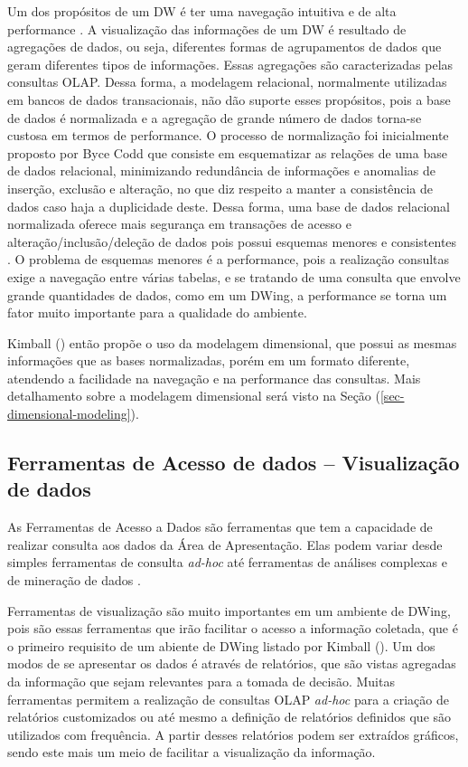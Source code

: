 Um dos propósitos de um DW é ter uma navegação intuitiva e de alta performance \cite{kimball2002}. A visualização das informações de um DW é resultado de agregações de dados, ou seja, diferentes formas de agrupamentos de dados que geram diferentes tipos de informações. Essas agregações são caracterizadas pelas consultas OLAP. Dessa forma, a modelagem relacional, normalmente utilizadas em bancos de dados transacionais, não dão suporte esses propósitos, pois a base de dados é normalizada e a agregação de grande número de dados torna-se custosa em termos de performance. O processo de normalização foi inicialmente proposto por Byce Codd  que consiste em esquematizar as relações de uma base de dados relacional, minimizando redundância de informações e anomalias de inserção, exclusão e alteração, no que diz respeito a manter a consistência de dados caso haja a duplicidade deste. Dessa forma, uma base de dados relacional normalizada oferece mais segurança em transações de acesso e alteração/inclusão/deleção de dados pois possui esquemas menores e consistentes \cite{elmasri2006}. O problema de esquemas menores é a performance, pois a realização consultas exige a navegação  entre várias tabelas, e se tratando de uma consulta que envolve grande quantidades de dados, como em um DWing, a performance se torna um fator muito importante para a qualidade do ambiente.

%

Kimball (\citeyear{kimball2002}) então propõe o uso da modelagem dimensional, que possui as mesmas informações que as bases normalizadas, porém em um formato diferente, atendendo a facilidade na navegação e na performance das consultas. Mais detalhamento sobre a modelagem dimensional será visto na Seção (\ref{sec-dimensional-modeling}).

%

\subsection{Ferramentas de Acesso de dados – Visualização de dados}

%

As Ferramentas de Acesso a Dados são ferramentas que tem a capacidade de realizar consulta aos dados da Área de Apresentação. Elas podem variar desde simples ferramentas de consulta \emph{ad-hoc} até ferramentas de análises complexas e de mineração de dados \cite{kimball2002}.

%

Ferramentas de visualização são muito importantes em um ambiente de DWing, pois são essas ferramentas que irão facilitar o acesso a informação coletada, que é o primeiro requisito de um abiente de DWing listado por Kimball (\citeyear{kimball2002}). Um dos modos de se apresentar os dados é através de relatórios, que são vistas agregadas da informação que sejam relevantes para a tomada de decisão. Muitas ferramentas permitem a realização de consultas OLAP \emph{ad-hoc} para a criação de relatórios customizados ou até mesmo a definição de relatórios definidos que são utilizados com frequência. A partir desses relatórios podem ser extraídos gráficos, sendo este mais um meio de facilitar a visualização da informação. 

